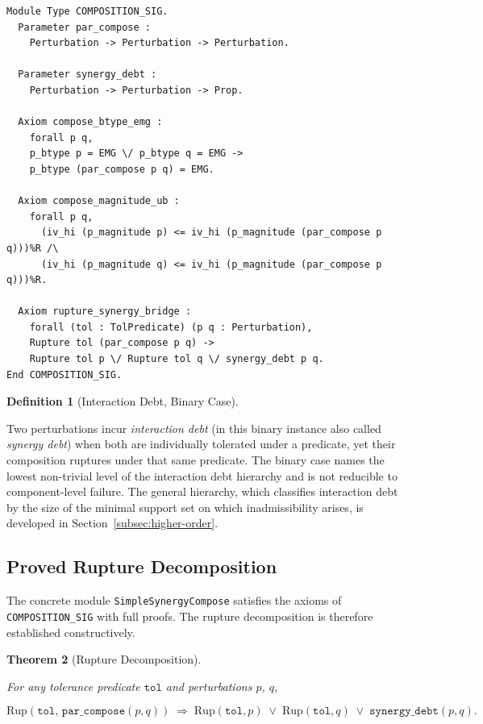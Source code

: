 \documentclass[pdflatex,sn-mathphys-num]{sn-jnl}
\theoremstyle{plain}
\newtheorem{theorem}{Theorem}[section]
\theoremstyle{definition}
\newtheorem{definition}[theorem]{Definition}
\theoremstyle{remark}
\begin{document}
\begin{lstlisting}[style=rocq,
caption={Abstract composition module signature.}]
Module Type COMPOSITION_SIG.
  Parameter par_compose :
    Perturbation -> Perturbation -> Perturbation.

  Parameter synergy_debt :
    Perturbation -> Perturbation -> Prop.

  Axiom compose_btype_emg :
    forall p q,
    p_btype p = EMG \/ p_btype q = EMG ->
    p_btype (par_compose p q) = EMG.

  Axiom compose_magnitude_ub :
    forall p q,
      (iv_hi (p_magnitude p) <= iv_hi (p_magnitude (par_compose p q)))%R /\
      (iv_hi (p_magnitude q) <= iv_hi (p_magnitude (par_compose p q)))%R.

  Axiom rupture_synergy_bridge :
    forall (tol : TolPredicate) (p q : Perturbation),
    Rupture tol (par_compose p q) ->
    Rupture tol p \/ Rupture tol q \/ synergy_debt p q.
End COMPOSITION_SIG.
\end{lstlisting}

\begin{definition}[Interaction Debt, Binary Case]
\label{def:synergy-debt}

Two perturbations incur \emph{interaction debt} (in this binary instance
also called \emph{synergy debt}) when both are individually tolerated
under a predicate, yet their composition ruptures under that same
predicate.
The binary case names the lowest non-trivial level of the interaction
debt hierarchy and is not reducible to component-level failure.
The general hierarchy, which classifies interaction debt by the size
of the minimal support set on which inadmissibility arises, is
developed in Section~\ref{subsec:higher-order}.

\end{definition}

\subsection{Proved Rupture Decomposition}

The concrete module \texttt{SimpleSynergyCompose} satisfies the axioms
of \texttt{COMPOSITION\_SIG} with full proofs.
The rupture decomposition is therefore established constructively.

\begin{theorem}[Rupture Decomposition]
\label{thm:rupture}

For any tolerance predicate $\mathtt{tol}$ and perturbations $p$, $q$,

\[
\mathrm{Rup}(\mathtt{tol},\, \mathtt{par\_compose}(p,q))
\;\Rightarrow\;
\mathrm{Rup}(\mathtt{tol}, p)
\;\vee\;
\mathrm{Rup}(\mathtt{tol}, q)
\;\vee\;
\mathtt{synergy\_debt}(p, q).
\]

\end{theorem}
\end{document}
